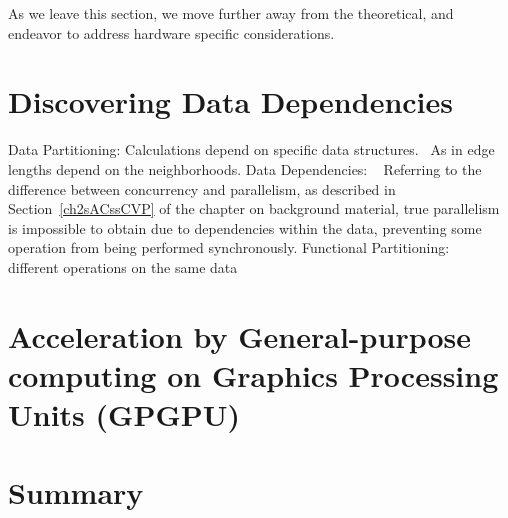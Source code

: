 As we leave this section, we move further away from the theoretical, and endeavor to address hardware specific considerations.

%
%
%
%
\section{Discovering Data Dependencies}

%
Data Partitioning:
Calculations depend on specific data structures.~\cite[p.~357]{Lang17}
As in edge lengths depend on the neighborhoods.
%
Data Dependencies: ~\cite[p.~358]{Lang17}
Referring to the difference between concurrency and parallelism, as described in Section~\ref{ch2sACssCVP} of the chapter on background material, true parallelism is impossible to obtain due to dependencies within the data, preventing some operation from being performed synchronously.
%
Functional Partitioning: ~\cite[p.~359]{Lang17}
different operations on the same data

%
%
%
\section[Acceleration by GPGPU]{Acceleration by General-purpose
computing on Graphics Processing Units (GPGPU)}

%
%
%
\section{Summary}

